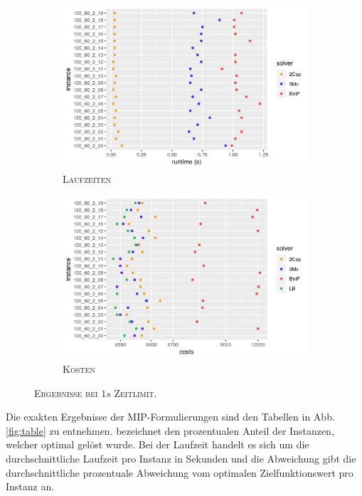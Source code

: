 \begin{figure}[H]
\centering
\begin{subfigure}[b]{0.4\textwidth}
\centering
\includegraphics[width=1.3\textwidth]{img/solver_instance_time_b=2_s_1s.png}
\caption{\textsc{Laufzeiten}}
\label{fig:b=2_s_runtimes}
\end{subfigure}
\hfill
\begin{subfigure}[b]{0.4\textwidth}
\centering
\includegraphics[width=1.3\textwidth]{img/solver_instance_cost_b=2_s_1s.png}
\caption{\textsc{Kosten}}
\label{fig:b=2_s_costs}
\end{subfigure}
\caption{\textsc{Ergebnisse bei $1s$ Zeitlimit}.}
\label{fig:b=2_s_results}
\end{figure}

Die exakten Ergebnisse der MIP-Formulierungen sind den Tabellen in Abb. \ref{fig:table} zu entnehmen.
 bezeichnet den prozentualen Anteil der Instanzen, welcher optimal gelöst wurde.
Bei der Laufzeit handelt es sich um die durchschnittliche Laufzeit pro Instanz in Sekunden und die
Abweichung gibt die durchschnittliche prozentuale Abweichung vom optimalen Zielfunktionswert pro Instanz an.

